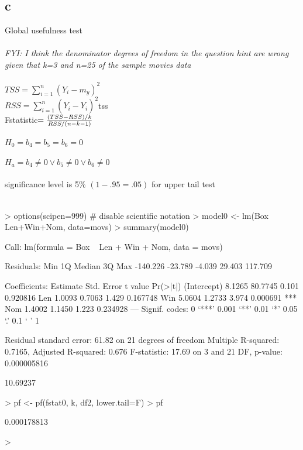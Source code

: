 \documentclass{article}
\begin{document}
\subsection*{c}
Global usefulness test
\\\\
\textit{FYI: I think the denominator degrees of freedom in the question hint are wrong given that k=3 and n=25 of the sample movies data}
\\\\
$TSS = \sum_{i=1}^{n}(Y_i - m_y)^2$
\\
$RSS = \sum_{i=1}^{n}(Y_i - \hat{Y_i})^2$tss
\\
Fstatistic$={(TSS-RSS)/k \over RSS/(n-k-1)}$
\\\\
$H_0=b_4=b_5=b_6=0$
\\\\
$H_a=b_4\neq0 \lor b_5\neq0 \lor b_6\neq0$
\\\\
significance level is 5\% $(1-.95 = .05)$ for upper tail test
\\\\
\begin{Schunk}
\begin{Sinput}
> options(scipen=999) # disable scientific notation
> model0 <- lm(Box ~ Len+Win+Nom, data=movs)
> summary(model0)
\end{Sinput}
\begin{Soutput}
Call:
lm(formula = Box ~ Len + Win + Nom, data = movs)

Residuals:
     Min       1Q   Median       3Q      Max 
-140.226  -23.789   -4.039   29.403  117.709 

Coefficients:
            Estimate Std. Error t value Pr(>|t|)    
(Intercept)   8.1265    80.7745   0.101 0.920816    
Len           1.0093     0.7063   1.429 0.167748    
Win           5.0604     1.2733   3.974 0.000691 ***
Nom           1.4002     1.1450   1.223 0.234928    
---
Signif. codes:  0 ‘***’ 0.001 ‘**’ 0.01 ‘*’ 0.05 ‘.’ 0.1 ‘ ’ 1

Residual standard error: 61.82 on 21 degrees of freedom
Multiple R-squared:  0.7165,	Adjusted R-squared:  0.676 
F-statistic: 17.69 on 3 and 21 DF,  p-value: 0.000005816
\end{Soutput}
\begin{Soutput}
[1] 10.69237
\end{Soutput}
\begin{Sinput}
> pf <- pf(fstat0, k, df2, lower.tail=F) 
> pf
\end{Sinput}
\begin{Soutput}
[1] 0.000178813
\end{Soutput}
\begin{Sinput}
> 
\end{Sinput}
\end{Schunk}
\end{document}
